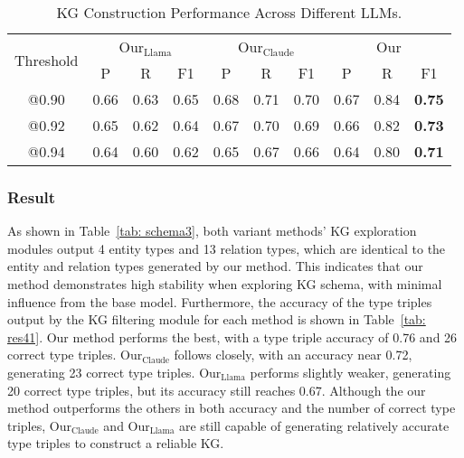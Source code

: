 \begin{table*}[t]
\centering
\caption{KG Construction Performance Across Different LLMs.}
\label{tab: rq42}
\begin{tabular}{c|ccc|ccc|ccc}
\hline
\multirow{2}{*}{Threshold} & \multicolumn{3}{c|}{Our$_{\text{Llama}}$}                                   & \multicolumn{3}{c|}{Our$_{\text{Claude}}$}                                  & \multicolumn{3}{c}{Our}                              \\ \cline{2-10} 
                           & \multicolumn{1}{c|}{P}    & \multicolumn{1}{c|}{R}    & F1   & \multicolumn{1}{c|}{P}    & \multicolumn{1}{c|}{R}    & F1   & \multicolumn{1}{c|}{P}    & \multicolumn{1}{c|}{R}    & F1   \\ \hline
@0.90                      & \multicolumn{1}{c|}{0.66} & \multicolumn{1}{c|}{0.63} & 0.65 & \multicolumn{1}{c|}{0.68} & \multicolumn{1}{c|}{0.71} & 0.70 & \multicolumn{1}{c|}{0.67} & \multicolumn{1}{c|}{0.84} & \textbf{0.75} \\ \hline
@0.92                      & \multicolumn{1}{c|}{0.65} & \multicolumn{1}{c|}{0.62} & 0.64 & \multicolumn{1}{c|}{0.67} & \multicolumn{1}{c|}{0.70} & 0.69 & \multicolumn{1}{c|}{0.66} & \multicolumn{1}{c|}{0.82} & \textbf{0.73} \\ \hline
@0.94                      & \multicolumn{1}{c|}{0.64} & \multicolumn{1}{c|}{0.60} & 0.62 & \multicolumn{1}{c|}{0.65} & \multicolumn{1}{c|}{0.67} & 0.66 & \multicolumn{1}{c|}{0.64} & \multicolumn{1}{c|}{0.80} & \textbf{0.71} \\ \hline
\end{tabular}
\end{table*}


\subsubsection{Result}
As shown in Table~\ref{tab: schema3}, both variant methods' KG exploration modules output 4 entity types and 13 relation types, which are identical to the entity and relation types generated by our method.
This indicates that our method demonstrates high stability when exploring KG schema, with minimal influence from the base model.
Furthermore, the accuracy of the type triples output by the KG filtering module for each method is shown in Table~\ref{tab: res41}.
Our method performs the best, with a type triple accuracy of 0.76 and 26 correct type triples.
Our$_{\text{Claude}}$ follows closely, with an accuracy near 0.72, generating 23 correct type triples.
Our$_{\text{Llama}}$ performs slightly weaker, generating 20 correct type triples, but its accuracy still reaches 0.67.
Although the our method outperforms the others in both accuracy and the number of correct type triples, Our$_{\text{Claude}}$ and Our$_{\text{Llama}}$ are still capable of generating relatively accurate type triples to construct a reliable KG.

